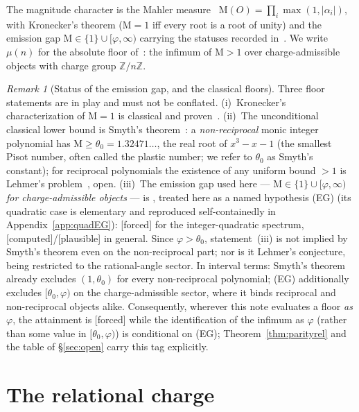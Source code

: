 \documentclass[11pt]{article}
\theoremstyle{plain}
\theoremstyle{definition}
\theoremstyle{remark}
\newtheorem{remark}[theorem]{Remark}
\newcommand{\Z}{\mathbb{Z}}
\newcommand{\Mah}{\mathrm{M}}
\newcommand{\F}{\textnormal{[forced]}}
\newcommand{\C}{\textnormal{[computed]}}
\newcommand{\Pl}{\textnormal{[plausible]}}
\begin{document}
The magnitude character is the Mahler measure~\cite{Mahler}
$\Mah(O)=\prod_i\max(1,|\alpha_i|)$, with Kronecker's theorem ($\Mah=1$ iff every
root is a root of unity) and the emission gap
$\Mah\in\{1\}\cup[\varphi,\infty)$ carrying the statuses recorded
in~\cite[\S2, \S8]{CMC}. We write $\mu(n)$ for the absolute floor of~\cite[Thm.~5.1]{CMC}:
the infimum of $\Mah>1$ over charge-admissible objects with charge group $\Z/n\Z$.

\begin{remark}[Status of the emission gap, and the classical floors]
\label{rem:gapstatus}
Three floor statements are in play and must not be conflated.
(i)~Kronecker's characterization of $\Mah=1$ is classical and
proven~\cite{Kronecker}. (ii)~The unconditional classical lower bound is
Smyth's theorem~\cite{Smyth}: a \emph{non-reciprocal} monic integer
polynomial has $\Mah\ge\theta_0=1.32471\ldots$, the real root of $x^3-x-1$
(the smallest Pisot number, often called the plastic number; we refer to
$\theta_0$ as Smyth's constant); for reciprocal polynomials the existence of any uniform bound $>1$ is
Lehmer's problem~\cite{Lehmer}, open. (iii)~The emission gap used here ---
$\Mah\in\{1\}\cup[\varphi,\infty)$ \emph{for charge-admissible objects} ---
is \cite[Prop.~2.3]{CMC}, treated here as a named hypothesis \textup{(EG)}
(its quadratic case is elementary and reproduced self-containedly in
Appendix~\ref{app:quadEG}):
\F{} for the integer-quadratic spectrum, \C/\Pl{} in general. Since $\varphi>\theta_0$, statement~(iii) is not implied by
Smyth's theorem even on the non-reciprocal part; nor is it Lehmer's
conjecture, being restricted to the rational-angle sector. In interval
terms: Smyth's theorem already excludes $(1,\theta_0)$ for every
non-reciprocal polynomial; \textup{(EG)} additionally excludes
$[\theta_0,\varphi)$ on the charge-admissible sector, where it binds
reciprocal and non-reciprocal objects alike. Consequently,
wherever this note evaluates a floor \emph{as} $\varphi$, the attainment is
\F{} while the identification of the infimum as $\varphi$ (rather than some
value in $[\theta_0,\varphi)$) is conditional on \textup{(EG)};
Theorem~\ref{thm:parityrel} and the table of \S\ref{sec:open} carry this
tag explicitly.
\end{remark}

\section{The relational charge}\label{sec:relational}
\end{document}
